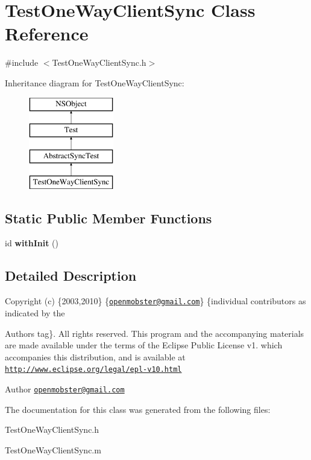 \hypertarget{interface_test_one_way_client_sync}{
\section{\-Test\-One\-Way\-Client\-Sync \-Class \-Reference}
\label{interface_test_one_way_client_sync}
}


{\ttfamily \#include $<$\-Test\-One\-Way\-Client\-Sync.\-h$>$}

\-Inheritance diagram for \-Test\-One\-Way\-Client\-Sync\-:\begin{figure}[H]
\begin{center}
\leavevmode
\includegraphics[height=4.000000cm]{interface_test_one_way_client_sync}
\end{center}
\end{figure}
\subsection*{\-Static \-Public \-Member \-Functions}
\begin{DoxyCompactItemize}
\item 
\hypertarget{interface_test_one_way_client_sync_a79669fcd444a59a3196c8ad5b2cb43a4}{
id {\bfseries with\-Init} ()}
\label{interface_test_one_way_client_sync_a79669fcd444a59a3196c8ad5b2cb43a4}

\end{DoxyCompactItemize}


\subsection{\-Detailed \-Description}
\-Copyright (c) \{2003,2010\} \{\href{mailto:openmobster@gmail.com}{\tt openmobster@gmail.\-com}\} \{individual contributors as indicated by the \begin{DoxyAuthor}{\-Authors}
tag\}. \-All rights reserved. \-This program and the accompanying materials are made available under the terms of the \-Eclipse \-Public \-License v1. which accompanies this distribution, and is available at \href{http://www.eclipse.org/legal/epl-v10.html}{\tt http\-://www.\-eclipse.\-org/legal/epl-\/v10.\-html}
\end{DoxyAuthor}
\begin{DoxyAuthor}{\-Author}
\href{mailto:openmobster@gmail.com}{\tt openmobster@gmail.\-com} 
\end{DoxyAuthor}


\-The documentation for this class was generated from the following files\-:\begin{DoxyCompactItemize}
\item 
\-Test\-One\-Way\-Client\-Sync.\-h\item 
\-Test\-One\-Way\-Client\-Sync.\-m\end{DoxyCompactItemize}
